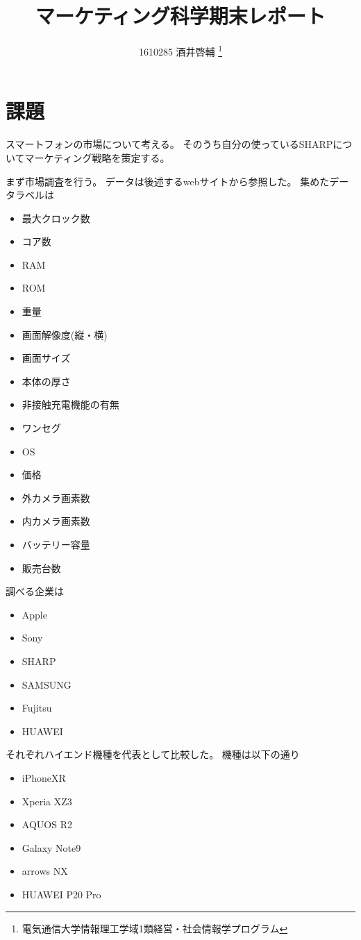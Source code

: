 \documentclass{jarticle}
\title{マーケティング科学期末レポート}
\author{1610285 酒井啓輔
\thanks{電気通信大学情報理工学域1類経営・社会情報学プログラム}}
\begin{document}
\begin{titlepage}
\maketitle
\thispagestyle{empty}
\end{titlepage}

\section{課題}
スマートフォンの市場について考える。
そのうち自分の使っているSHARPについてマーケティング戦略を策定する。

まず市場調査を行う。
データは後述するwebサイトから参照した。
集めたデータラベルは
\begin{itemize}
\item 最大クロック数
\item コア数
\item RAM
\item ROM
\item 重量
\item 画面解像度(縦・横)
\item 画面サイズ
\item 本体の厚さ
\item 非接触充電機能の有無
\item ワンセグ
\item OS
\item 価格
\item 外カメラ画素数
\item 内カメラ画素数
\item バッテリー容量
\item 販売台数
\end{itemize}
調べる企業は
\begin{itemize}
\item Apple
\item Sony
\item SHARP
\item SAMSUNG
\item Fujitsu
\item HUAWEI
\end{itemize}
それぞれハイエンド機種を代表として比較した。
機種は以下の通り
\begin{itemize}
\item iPhoneXR
\item Xperia XZ3
\item AQUOS R2
\item Galaxy Note9
\item arrows NX
\item HUAWEI P20 Pro
\end{itemize}
\end{document}
